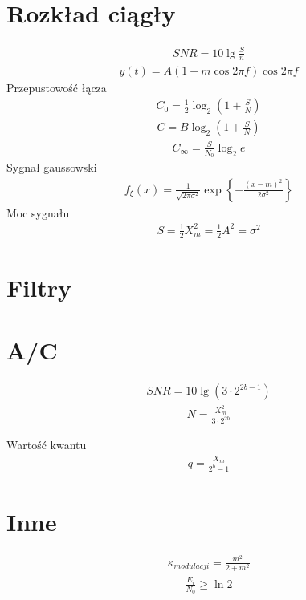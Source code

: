 \documentclass[10pt,i,twocolumn,a4paper]{article}
\begin{document}
\section{Rozkład ciągły}
\begin{align*}
SNR = 10\lg{\frac{S}{n}}
\end{align*}
\begin{align*}
	y(t) = A(1+m\cos{2\pi f})\cos{2\pi f}
\end{align*}
Przepustowość łącza
\begin{align*}
	C_0 = \frac{1}{2}\log_2(1+\frac{S}{N})
\end{align*}
\begin{align*}
	C=B\log_2(1+\frac{S}{N})
\end{align*}
\begin{align*}
	C_{\infty} = \frac{S}{N_0}\log_2{e}
\end{align*}
Sygnał gaussowski
\begin{align*}
	f_\xi(x) = \frac{1}{\sqrt{2\pi \sigma^2}} \exp\left\{-\frac{(x-m)^2}{2\sigma^2}\right\}
\end{align*}
Moc sygnału
\begin{align*}
	S = \frac{1}{2} X_m^2 = \frac{1}{2} A^2 = \sigma^2
\end{align*}

\section{Filtry} 
\section{A/C} 
\begin{align*}
	SNR = 10 \lg(3\cdot2^{2b-1})
\end{align*}
\begin{align*}
	N = \frac{X_m^2}{3\cdot2^{2b}}
\end{align*}

Wartość kwantu
\begin{align*}
	q = \frac{X_m}{2^b-1}
\end{align*}


\section{Inne} 
\begin{align*}
	\kappa_{modulacji} = \frac{m^2}{2+m^2}
\end{align*}
\begin{align*}
	\frac{E_i}{N_0} \ge \ln{2}
\end{align*}
\end{document}
